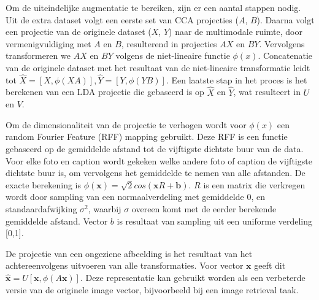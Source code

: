 Om de uiteindelijke augmentatie te bereiken, zijn er een aantal stappen nodig. Uit de extra dataset volgt een eerste set van CCA projecties ($A$, $B$). Daarna volgt een projectie van de originele dataset ($X$, $Y$) naar de multimodale ruimte, door vermenigvuldiging met $A$ en $B$, resulterend in projecties $AX$ en $BY$. Vervolgens transformeren we $AX$ en $BY$ volgens de niet-lineaire functie $\phi(x)$. Concatenatie van de originele dataset met het resultaat van de niet-lineaire transformatie leidt tot $\hat{X} = [X, \phi(XA)], \hat{Y} = [Y, \phi(YB)]$. Een laatste stap in het proces is het berekenen van een LDA projectie die gebaseerd is op $\hat{X}$ en $\hat{Y}$, wat resulteert in $U$ en $V$.


Om de dimensionaliteit van de projectie te verhogen wordt voor $\phi(x)$ een random Fourier Feature (RFF) mapping gebruikt. Deze RFF is een functie gebaseerd op de gemiddelde afstand tot de vijftigste dichtste buur van de data. Voor elke foto en caption wordt gekeken welke andere foto of caption de vijftigste dichtste buur is, om vervolgens het gemiddelde te nemen van alle afstanden. De exacte berekening is $\phi(\mathbf{x})=\sqrt{2}cos(\mathbf{x}R+\mathbf{b})$. $R$ is een matrix die verkregen wordt door sampling van een normaalverdeling met gemiddelde 0, en standaardafwijking $\sigma^2$, waarbij $\sigma$ overeen komt met de eerder berekende gemiddelde afstand. Vector $b$ is resultaat van sampling uit een uniforme verdeling [0,1].

De projectie van een ongeziene afbeelding is het resultaat van het achtereenvolgens uitvoeren van alle transformaties. Voor vector $\mathbf{x}$ geeft dit $\mathbf{\hat{x}} = U[\mathbf{x}, \phi(A\mathbf{x})]$. Deze representatie kan gebruikt worden als een verbeterde versie van de originele image vector, bijvoorbeeld bij een image retrieval taak.